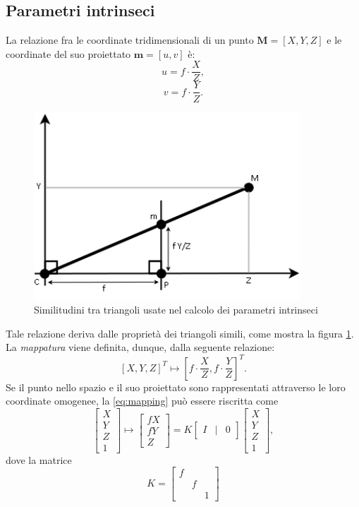 \subsection{Parametri intrinseci}
La relazione fra le coordinate tridimensionali di un punto $\textbf{M}=[X,Y,Z]$ e le coordinate del suo proiettato $\textbf{m}=[u,v]$ \`e:
\[u=f\cdot \frac{X}{Z},\]
\[v=f\cdot \frac{Y}{Z}.\]
\begin{figure}
	\centering
	\includegraphics[width=10cm]{./pictures/mappatura2d3d}
	\caption{Similitudini tra triangoli usate nel calcolo dei parametri intrinseci}
	\label{fig:mapping}
\end{figure}
\noindent Tale relazione deriva dalle propriet\`a dei triangoli simili, come mostra la figura \ref{fig:mapping}.
La \textit{mappatura} viene definita, dunque, dalla seguente relazione:
\begin{equation}
\label{eq:mapping}
[X,Y,Z]^\textit{T} \mapsto \left[f\cdot \frac{X}{Z}, f\cdot \frac{Y}{Z}\right]^\textit{T}.
\end{equation} 
Se il punto nello spazio e il suo proiettato sono rappresentati attraverso le loro coordinate omogenee, la \eqref{eq:mapping} pu\`o essere riscritta come
\begin{equation}
\label{eq:mappingMatrix}
\left[\begin{array}{c}
X \\ Y \\ Z \\ 1
\end{array}\right] \mapsto 
\left[\begin{array}{c}
fX \\ fY \\ Z
\end{array}\right] = 
K \left[\begin{array}{rcl}
I & | & 0
\end{array}\right]
\left[\begin{array}{c}
X \\ Y \\ Z \\ 1
\end{array}\right],
\end{equation}
dove la matrice
\begin{equation}
\label{eq:kSimple}
K = 
\left[\begin{array}{rccl}
f & & \\
& f & \\
& & 1 
\end{array}\right]
\end{equation}

